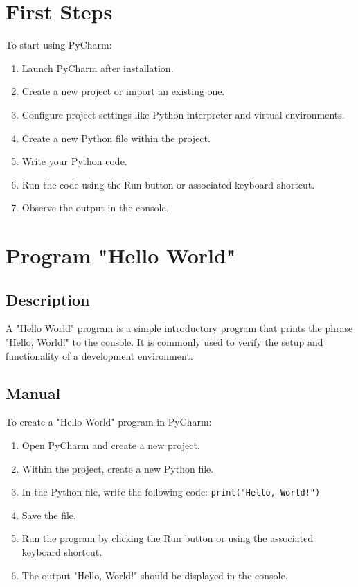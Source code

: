 \section{First Steps}
To start using PyCharm:
\begin{enumerate}
	\item Launch PyCharm after installation.
	\item Create a new project or import an existing one.
	\item Configure project settings like Python interpreter and virtual environments.
	\item Create a new Python file within the project.
	\item Write your Python code.
	\item Run the code using the Run button or associated keyboard shortcut.
	\item Observe the output in the console.
\end{enumerate}

\section{Program "Hello World"}
\subsection{Description}
A "Hello World" program is a simple introductory program that prints the phrase "Hello, World!" to the console. It is commonly used to verify the setup and functionality of a development environment.

\subsection{Manual}
To create a "Hello World" program in PyCharm:
\begin{enumerate}
	\item Open PyCharm and create a new project.
	\item Within the project, create a new Python file.
	\item In the Python file, write the following code: \texttt{print("Hello, World!")}
	\item Save the file.
	\item Run the program by clicking the Run button or using the associated keyboard shortcut.
	\item The output "Hello, World!" should be displayed in the console.
\end{enumerate}
